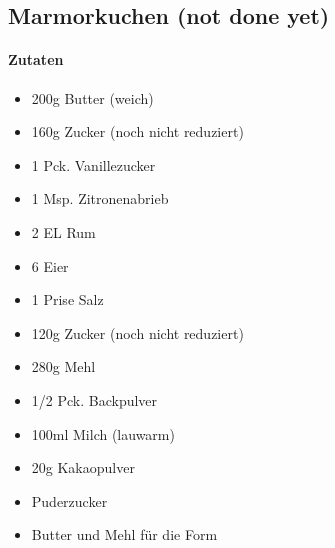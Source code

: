 \newpage
\subsection{Marmorkuchen (not done yet)}
\paragraph{Zutaten}
\begin{itemize}[noitemsep]
	\item 200g Butter (weich)
	\item 160g Zucker (noch nicht reduziert)
	\item 1 Pck. Vanillezucker
	\item 1 Msp. Zitronenabrieb
	\item 2 EL Rum
	\item 6 Eier
	\item 1 Prise Salz
	\item 120g Zucker (noch nicht reduziert)
	\item 280g Mehl
	\item 1/2 Pck. Backpulver
	\item 100ml Milch (lauwarm)
	\item 20g Kakaopulver 
	\item Puderzucker
	\item Butter und Mehl für die Form
\end{itemize}
